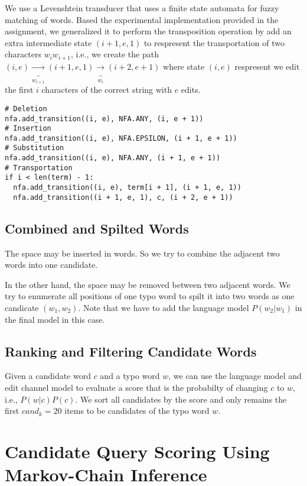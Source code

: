 We use a Levenshtein transducer that uses a finite state automata for fuzzy matching of words. 
Based the experimental implementation provided in the assignment, we generalized it to perform the transposition operation by add an extra intermediate state $(i + 1, e, 1)$ to respresent the transportation of two characters $w_i w_{i+1}$, i.e., we create the path $(i, e) \underbrace{\to}_{w_{i + 1}} (i + 1, e, 1) \underbrace{\to}_{w_{i}} (i + 2, e + 1)$ where state $(i, e)$ respresent we edit the first $i$ characters of the correct string with $e$ edits.

\begin{lstlisting}[caption={Exerpt from automata.py}]
# Deletion
nfa.add_transition((i, e), NFA.ANY, (i, e + 1))
# Insertion
nfa.add_transition((i, e), NFA.EPSILON, (i + 1, e + 1))
# Substitution
nfa.add_transition((i, e), NFA.ANY, (i + 1, e + 1))
# Transportation
if i < len(term) - 1:
  nfa.add_transition((i, e), term[i + 1], (i + 1, e, 1))
  nfa.add_transition((i + 1, e, 1), c, (i + 2, e + 1))
\end{lstlisting}

\subsection{Combined and Spilted Words}
The space may be inserted in words. So we try to combine the adjacent two words into one candidate.

In the other hand, the space may be removed between two adjacent words. We try to enumerate all positions of one typo word to spilt it into two words as one candicate $(w_1, w_2)$. 
Note that we have to add the language model $P(w_2 | w_1)$ in the final model in this case.

\subsection{Ranking and Filtering Candidate Words}
Given a candidate word $c$ and a typo word $w$, we can use the language model and edit channel model to evaluate a score that is the probabilty of changing $c$ to $w$, i.e., $P(w | c) P(c)$.
We sort all candidates by the score and only remains the first $cand_k = 20$ items to be candidates of the typo word $w$.

\section{Candidate Query Scoring Using Markov-Chain Inference}

